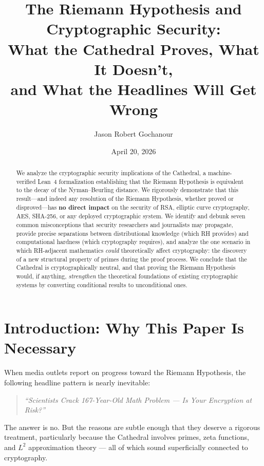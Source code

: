 \documentclass[11pt,a4paper]{article}
\title{%
  The Riemann Hypothesis and Cryptographic Security:\\
  What the Cathedral Proves, What It Doesn't,\\
  and What the Headlines Will Get Wrong%
}
\author{
  Jason Robert Gochanour
}
\date{April 20, 2026}
\theoremstyle{definition}
\theoremstyle{plain}
\begin{document}
\maketitle

\begin{abstract}
We analyze the cryptographic security implications of the Cathedral, a
machine-verified Lean~4 formalization establishing that the Riemann
Hypothesis is equivalent to the decay of the Nyman--Beurling distance.
We rigorously demonstrate that this result---and indeed any resolution
of the Riemann Hypothesis, whether proved or disproved---has
\textbf{no direct impact} on the security of RSA, elliptic curve
cryptography, AES, SHA-256, or any deployed cryptographic system.
We identify and debunk seven common misconceptions that security
researchers and journalists may propagate, provide precise
separations between distributional knowledge (which RH provides) and
computational hardness (which cryptography requires), and analyze
the one scenario in which RH-adjacent mathematics \emph{could}
theoretically affect cryptography: the discovery of a new structural
property of primes during the proof process. We conclude that the
Cathedral is cryptographically neutral, and that proving the Riemann
Hypothesis would, if anything, \emph{strengthen} the theoretical
foundations of existing cryptographic systems by converting
conditional results to unconditional ones.
\end{abstract}

\tableofcontents

\section{Introduction: Why This Paper Is Necessary}

When media outlets report on progress toward the Riemann Hypothesis,
the following headline pattern is nearly inevitable:

\begin{quote}
\emph{``Scientists Crack 167-Year-Old Math Problem --- Is Your
Encryption at Risk?''}
\end{quote}

The answer is no. But the reasons are subtle enough that they deserve
a rigorous treatment, particularly because the Cathedral involves
primes, zeta functions, and $L^2$ approximation theory --- all of
which sound superficially connected to cryptography.
\end{document}
